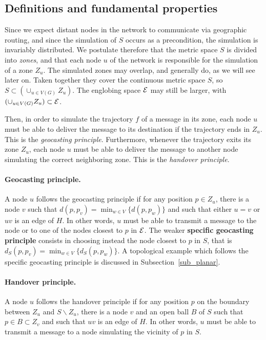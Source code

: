 \documentclass{article}
\newcommand{\englobing}{{\cal E}}
\begin{document}
\subsection{Definitions and fundamental properties}
\label{sub_def}
Since we expect distant nodes in the network to communicate via geographic routing, and since the simulation of $S$ occurs as a precondition, the simulation is invariably distributed. We postulate therefore that the metric space $S$ is divided into {\em zones}, and that each node $u$ of the network is responsible for the simulation of a zone $Z_u$. The simulated zones may overlap, and generally do, as we will see later on. Taken together they cover the continuous metric space $S$, so $S\subset(\cup_{u\in V(G)} Z_u)$. The englobing space $\englobing$ may still be larger, with $(\cup_{u\in V(G)} Z_u)\subset\englobing$.

Then, in order to simulate the trajectory $f$ of a message in its zone, each node $u$ must be able to deliver the message to its destination if the trajectory ends in $Z_u$. This is the {\em geocasting principle}. Furthermore, whenever the trajectory exits its zone $Z_u$, each node $u$ must be able to deliver the message to another node simulating the correct neighboring zone. This is the {\em handover principle}.

\paragraph{Geocasting principle.} A node $u$ follows the geocasting principle if for any position $p\in Z_u$, there is a node $v$ such that $d(p,p_v) = \min_{w\in V} \{d(p,p_w)\}$ and such that either $u=v$ or $uv$ is an edge of $H$. In other words, $u$ must be able to transmit a message to the node or to one of the nodes closest to $p$ in $\englobing$. The weaker {\bf specific geocasting principle} consists in choosing instead the node closest to $p$ in $S$, that is $d_S(p,p_v) = \min_{w\in V} \{d_S(p,p_w)\}$. A topological example which follows the specific geocasting principle is discussed in Subsection~\ref{sub_planar}.

\paragraph{Handover principle.} A node $u$ follows the handover principle if for any position $p$ on the boundary between $Z_u$ and $S\backslash Z_u$, there is a node $v$ and an open ball $B$ of $S$ such that $p\in B\subset Z_v$ and such that $uv$ is an edge of $H$.
In other words, $u$ must be able to transmit a message to a node simulating the vicinity of $p$ in $S$.
\end{document}
